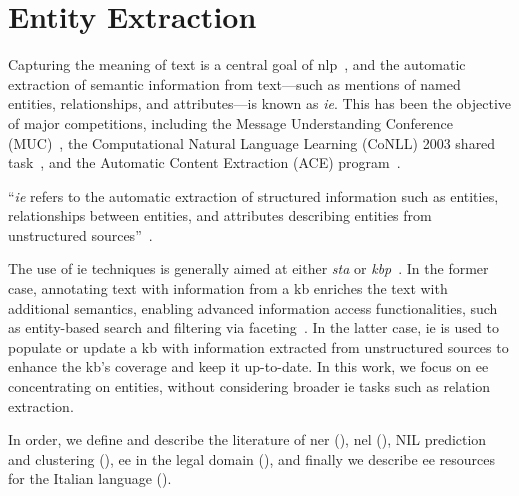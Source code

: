 \section{Entity Extraction}
\label{sec:information_extraction}

Capturing the meaning of text is a central goal of \acl{nlp}~\cite{entityorientedsearch2018balog}, and the automatic extraction of semantic information from text---such as mentions of named entities, relationships, and attributes---is known as \emph{\acl{ie}}. This has been the objective of major competitions, including the Message Understanding Conference (MUC)~\cite{muc_lessons_1998,muc6_overview_1995,muc7_overview_1998}, the Computational Natural Language Learning (CoNLL) 2003 shared task~\cite{conll2003}, and the Automatic Content Extraction (ACE) program~\cite{ace_2004}.

\begin{definition}
``\emph{\Acf{ie}} refers to the automatic extraction of structured information such as entities, relationships between entities, and attributes describing entities from unstructured sources''~\cite{infoextraction2008}.
\end{definition}
The use of \ac{ie} techniques is generally aimed at either \emph{\acl{sta}} or \emph{\acl{kbp}}~\cite{entityorientedsearch2018balog}.
In the former case, annotating text with information from a \ac{kb} enriches the text with additional semantics, enabling advanced information access functionalities, such as entity-based search and filtering via faceting~\cite{entityorientedsearch2018balog,ARMENTANO2014_nlp_faceted,hearst_2006_faceted}.
In the latter case, \ac{ie} is used to populate or update a \ac{kb} with information extracted from unstructured sources to enhance the \ac{kb}'s coverage and keep it up-to-date.
In this work, we focus on \acf{ee} concentrating on entities, without considering broader \ac{ie} tasks such as relation extraction. 

In order, we define and describe the literature of \acl{ner} (), \acl{nel} (), NIL prediction and clustering (), \ac{ee} in the legal domain (), and finally we describe \ac{ee} resources for the Italian language ().




